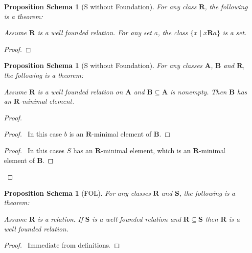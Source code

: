 \documentclass{book}
\let\qed\relax
\newtheorem{props}[ax]{Proposition Schema}
\theoremstyle{definition}
\begin{document}
\begin{props}[S without Foundation]
\label{prop:segset}
For any class $\mathbf{R}$, the following is a theorem:

Assume $\mathbf{R}$ is a well founded relation. For any set $a$, the class $\{ x \mid x \mathbf{R} a\}$ is a set.
\end{props}

\begin{proof}
\pf
{}
\qed
\end{proof}

\begin{props}[S without Foundation]
\label{prop:leastelement}
For any classes $\mathbf{A}$, $\mathbf{B}$ and $\mathbf{R}$, the following is a theorem:

Assume $\mathbf{R}$ is a well founded relation on $\mathbf{A}$ and $\mathbf{B} \subseteq \mathbf{A}$ is nonempty. Then $\mathbf{B}$ has an $\mathbf{R}$-minimal element.
\end{props}

\begin{proof}
\pf
{}
\begin{proof}
	\pf\ In this case $b$ is an $\mathbf{R}$-minimal element of $\mathbf{B}$.
\end{proof}
\begin{proof}
	\pf\ In this cases $S$ has an $\mathbf{R}$-minimal element, which is an $\mathbf{R}$-minimal element of $\mathbf{B}$.
\end{proof}
\qed
\end{proof}

\begin{props}[FOL]
\label{prop:subwellfounded}
For any classes $\mathbf{R}$ and $\mathbf{S}$, the following is a theorem:

Assume $\mathbf{R}$ is a relation.
If $\mathbf{S}$ is a well-founded relation and $\mathbf{R} \subseteq \mathbf{S}$ then $\mathbf{R}$ is a well founded relation.
\end{props}

\begin{proof}
\pf\ Immediate from definitions.
\qed
\end{proof}
\end{document}
